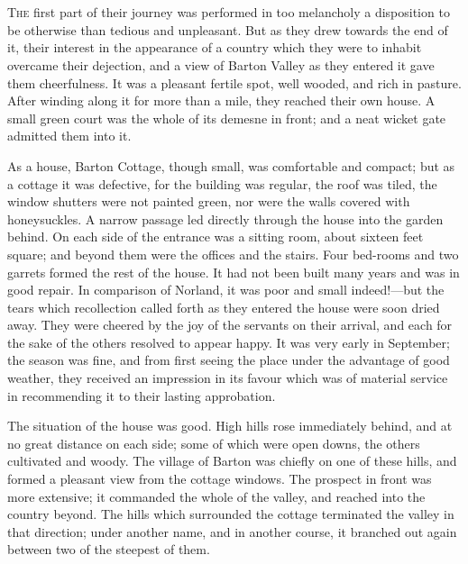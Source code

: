\chapter[Chapter \thechapter]{}
\lettrine[lines=4,lraise=0.3]{T}{he} first part of their journey was performed in too melancholy a disposition to be otherwise than tedious and unpleasant. But as they drew towards the end of it, their interest in the appearance of a country which they were to inhabit overcame their dejection, and a view of Barton Valley as they entered it gave them cheerfulness. It was a pleasant fertile spot, well wooded, and rich in pasture. After winding along it for more than a mile, they reached their own house. A small green court was the whole of its demesne in front; and a neat wicket gate admitted them into it.

As a house, Barton Cottage, though small, was comfortable and compact; but as a cottage it was defective, for the building was regular, the roof was tiled, the window shutters were not painted green, nor were the walls covered with honeysuckles. A narrow passage led directly through the house into the garden behind. On each side of the entrance was a sitting room, about sixteen feet square; and beyond them were the offices and the stairs. Four bed-rooms and two garrets formed the rest of the house. It had not been built many years and was in good repair. In comparison of Norland, it was poor and small indeed!—but the tears which recollection called forth as they entered the house were soon dried away. They were cheered by the joy of the servants on their arrival, and each for the sake of the others resolved to appear happy. It was very early in September; the season was fine, and from first seeing the place under the advantage of good weather, they received an impression in its favour which was of material service in recommending it to their lasting approbation.

The situation of the house was good. High hills rose immediately behind, and at no great distance on each side; some of which were open downs, the others cultivated and woody. The village of Barton was chiefly on one of these hills, and formed a pleasant view from the cottage windows. The prospect in front was more extensive; it commanded the whole of the valley, and reached into the country beyond. The hills which surrounded the cottage terminated the valley in that direction; under another name, and in another course, it branched out again between two of the steepest of them.

